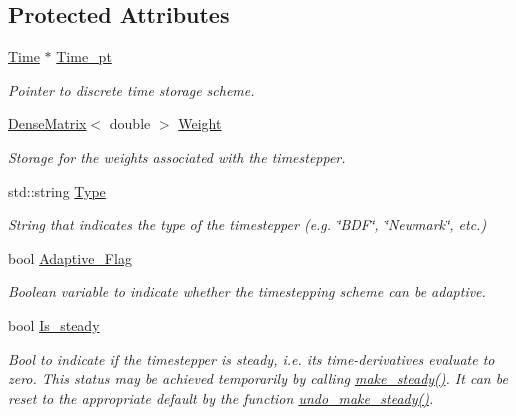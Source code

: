 \subsection*{Protected Attributes}
\begin{DoxyCompactItemize}
\item 
\hyperlink{classoomph_1_1Time}{Time} $\ast$ \hyperlink{classoomph_1_1TimeStepper_a38740bc33e75ecfd61746ff43be54358}{Time\+\_\+pt}
\begin{DoxyCompactList}\small\item\em Pointer to discrete time storage scheme. \end{DoxyCompactList}\item 
\hyperlink{classoomph_1_1DenseMatrix}{Dense\+Matrix}$<$ double $>$ \hyperlink{classoomph_1_1TimeStepper_a0dbf867c7f0e06f790a470d547b6b3f2}{Weight}
\begin{DoxyCompactList}\small\item\em Storage for the weights associated with the timestepper. \end{DoxyCompactList}\item 
std\+::string \hyperlink{classoomph_1_1TimeStepper_a39dfe6cf216263d547c430d6f7a67530}{Type}
\begin{DoxyCompactList}\small\item\em String that indicates the type of the timestepper (e.\+g. \char`\"{}\+B\+D\+F\char`\"{}, \char`\"{}\+Newmark\char`\"{}, etc.) \end{DoxyCompactList}\item 
bool \hyperlink{classoomph_1_1TimeStepper_afe6d4d7cf3e0b2a186694f24c8cf016f}{Adaptive\+\_\+\+Flag}
\begin{DoxyCompactList}\small\item\em Boolean variable to indicate whether the timestepping scheme can be adaptive. \end{DoxyCompactList}\item 
bool \hyperlink{classoomph_1_1TimeStepper_a5a23db485d16d7f9598c011850d0563f}{Is\+\_\+steady}
\begin{DoxyCompactList}\small\item\em Bool to indicate if the timestepper is steady, i.\+e. its time-\/derivatives evaluate to zero. This status may be achieved temporarily by calling \hyperlink{classoomph_1_1TimeStepper_a81ea0ff2e66cef5e0184b616c608e418}{make\+\_\+steady()}. It can be reset to the appropriate default by the function \hyperlink{classoomph_1_1TimeStepper_aada05f89e86aae352bd5b32bfb173b18}{undo\+\_\+make\+\_\+steady()}. \end{DoxyCompactList}\item 

\end{DoxyCompactItemize}
